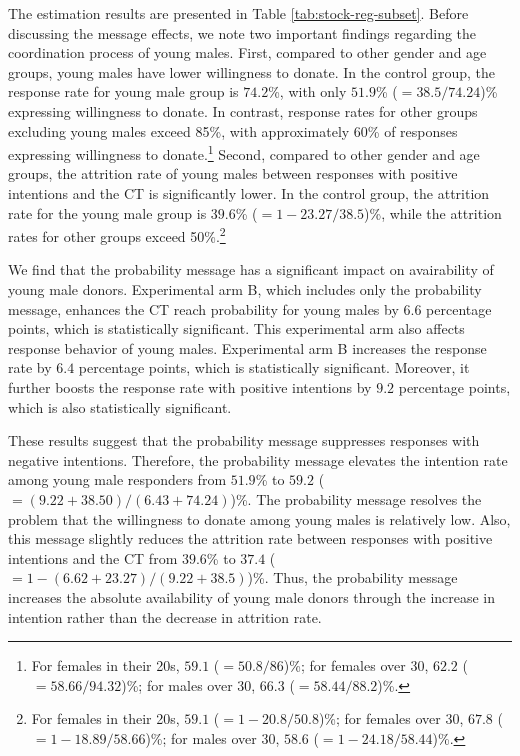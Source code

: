 \documentclass[12pt, a4paper]{article}
\begin{document}
The estimation results are presented in Table \ref{tab:stock-reg-subset}. Before discussing the message effects, we note two important findings regarding the coordination process of young males. First, compared to other gender and age groups, young males have lower willingness to donate. In the control group, the response rate for young male group is \(74.2\)\%, with only \(51.9\)\% (\(=38.5/74.24\))\% expressing willingness to donate. In contrast, response rates for other groups excluding young males exceed 85\%, with approximately 60\% of responses expressing willingness to donate.\footnote{For females in their 20s, \(59.1\) (\(=50.8/86\))\%; for females over 30, \(62.2\) (\(=58.66/94.32\))\%; for males over 30, \(66.3\) (\(=58.44/88.2\))\%.} Second, compared to other gender and age groups, the attrition rate of young males between responses with positive intentions and the CT is significantly lower. In the control group, the attrition rate for the young male group is \(39.6\)\% (\(=1-23.27/38.5\))\%, while the attrition rates for other groups exceed 50\%.\footnote{For females in their 20s, \(59.1\) (\(=1 - 20.8/50.8\))\%; for females over 30, \(67.8\) (\(=1-18.89/58.66\))\%; for males over 30, \(58.6\) (\(=1-24.18/58.44\))\%.}

We find that the probability message has a significant impact on avairability of young male donors. Experimental arm B, which includes only the probability message, enhances the CT reach probability for young males by \(6.6\) percentage points, which is statistically significant. This experimental arm also affects response behavior of young males. Experimental arm B increases the response rate by \(6.4\) percentage points, which is statistically significant. Moreover, it further boosts the response rate with positive intentions by \(9.2\) percentage points, which is also statistically significant.

These results suggest that the probability message suppresses responses with negative intentions. Therefore, the probability message elevates the intention rate among young male responders from \(51.9\)\% to \(59.2\) (\(=(9.22+38.50)/(6.43+74.24)\))\%. The probability message resolves the problem that the willingness to donate among young males is relatively low. Also, this message slightly reduces the attrition rate between responses with positive intentions and the CT from \(39.6\)\% to \(37.4\) (\(=1-(6.62+23.27)/(9.22+38.5)\))\%. Thus, the probability message increases the absolute availability of young male donors through the increase in intention rather than the decrease in attrition rate.
\end{document}
